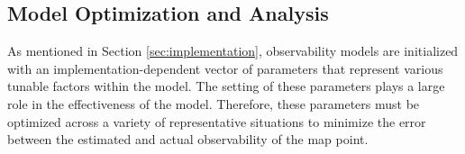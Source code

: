 \subsection{Model Optimization and Analysis}

As mentioned in Section \ref{sec:implementation}, observability models are initialized with an implementation-dependent vector of parameters that represent various tunable factors within the model. The setting of these parameters plays a large role in the effectiveness of the model. Therefore, these parameters must be optimized across a variety of representative situations to minimize the error between the estimated and actual observability of the map point. 

\subsubsection{}